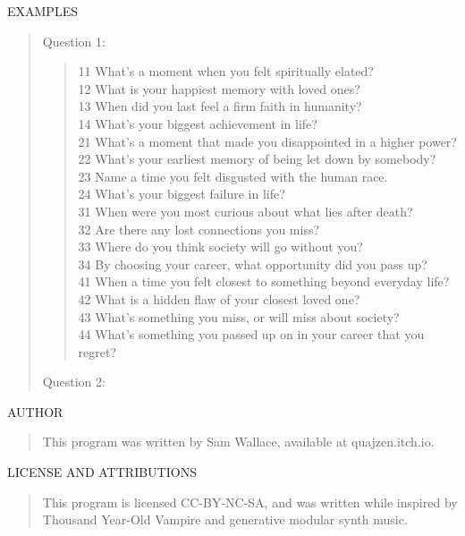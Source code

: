 \documentclass{article}
\begin{document}
EXAMPLES
\begin{quote}
  Question 1:
  \begin{quote}
    11 \qquad What's a moment when you felt spiritually elated? \\
    12 \qquad What is your happiest memory with loved ones? \\
    13 \qquad When did you last feel a firm faith in humanity? \\
    14 \qquad What's your biggest achievement in life? \\
    21 \qquad What's a moment that made you disappointed in a higher power? \\
    22 \qquad What's your earliest memory of being let down by somebody? \\
    23 \qquad Name a time you felt disgusted with the human race. \\
    24 \qquad What's your biggest failure in life? \\
    31 \qquad When were you most curious about what lies after death? \\
    32 \qquad Are there any lost connections you miss? \\
    33 \qquad Where do you think society will go without you? \\
    34 \qquad By choosing your career, what opportunity did you pass up? \\
    41 \qquad When a time you felt closest to something beyond everyday life? \\
    42 \qquad What is a hidden flaw of your closest loved one? \\
    43 \qquad What's something you miss, or will miss about society? \\
    44 \qquad What's something you passed up on in your career that you regret?
  \end{quote}
  Question 2:
  \begin{quote}
    
  \end{quote}
\end{quote}


AUTHOR
\begin{quote}
  This program was written by Sam Wallace, available at quajzen.itch.io.
\end{quote}

LICENSE AND ATTRIBUTIONS
\begin{quote}
  This program is licensed CC-BY-NC-SA, and was written while inspired by Thousand Year-Old Vampire and generative modular synth music.
\end{quote}
\end{document}
